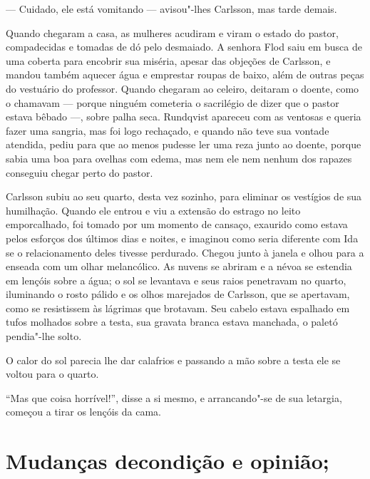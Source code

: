 --- Cuidado, ele está vomitando --- avisou"-lhes Carlsson, mas tarde demais.

Quando chegaram a casa, as mulheres acudiram e viram o estado do pastor, 
compadecidas e tomadas de dó pelo desmaiado. A senhora Flod saiu em busca de uma
coberta para encobrir sua miséria, apesar das objeções de Carlsson, e mandou
também aquecer água e emprestar roupas de baixo, além de outras peças do vestuário
do professor. Quando chegaram ao celeiro, deitaram o doente, como o chamavam
--- porque ninguém cometeria o sacrilégio de dizer que o pastor estava bêbado ---, sobre
palha seca. Rundqvist apareceu com as ventosas e queria fazer uma sangria, mas
foi logo rechaçado, e quando não teve sua vontade atendida, pediu para que ao
menos pudesse ler uma reza junto ao doente, porque sabia uma boa para ovelhas com
edema, mas nem ele nem nenhum dos rapazes conseguiu chegar perto do pastor.

Carlsson subiu ao seu quarto, desta vez sozinho, para eliminar os vestígios de sua
humilhação. Quando ele entrou e viu a extensão do estrago no leito emporcalhado,
foi tomado por um momento de cansaço, exaurido como estava pelos esforços dos
últimos dias e noites, e imaginou como seria diferente com Ida se o
relacionamento deles tivesse perdurado. Chegou junto à janela e olhou para
a enseada com um olhar melancólico. As nuvens se abriram e a névoa se
estendia em lençóis sobre a água; o sol se levantava e seus raios penetravam no quarto,
iluminando o rosto pálido e os olhos marejados de Carlsson, que se apertavam, como
se resistissem às lágrimas que brotavam. Seu cabelo estava espalhado em
tufos molhados sobre a testa, sua gravata branca estava manchada, o paletó
pendia"-lhe solto. 

O calor do sol parecia lhe dar calafrios e passando a
mão sobre a testa ele se voltou para o quarto. 

``Mas que coisa horrível!'', disse a si mesmo, e arrancando"-se 
de sua letargia, começou a tirar os lençóis da cama.

\chapter[Mudanças de condição e opinião\ldots]{Mudanças de\break condição e opinião; 
}

